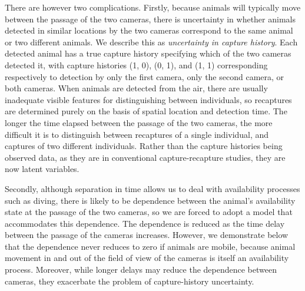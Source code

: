 \documentclass[useAMS, usenatbib, referee]{biom}\usepackage[]{graphicx}\usepackage[]{color}
\begin{document}
There are however two complications. Firstly, because animals will typically move between the passage of the two cameras, there is uncertainty in whether animals detected in similar locations by the two cameras correspond to the same animal or two different animals. We describe this as {\em uncertainty in capture history}. Each detected animal has a true capture history specifying which of the two cameras detected it, with capture histories (1, 0), (0, 1), and (1, 1) corresponding respectively to detection by only the first camera, only the second camera, or both cameras. When animals are detected from the air, there are usually inadequate visible features for distinguishing between individuals, so recaptures are determined purely on the basis of spatial location and detection time. The longer the time elapsed between the passage of the two cameras, the more difficult it is to distinguish between recaptures of a single individual, and captures of two different individuals. Rather than the capture histories being observed data, as they are in conventional capture-recapture studies, they are now latent variables.

Secondly, although separation in time allows us to deal with availability processes such as diving, there is likely to be dependence between the animal's availability state at the passage of the two cameras, so we are forced to adopt a model that accommodates this dependence. The dependence is reduced as the time delay between the passage of the cameras increases. However, we demonstrate below that the dependence never reduces to zero if animals are mobile, because animal movement in and out of the field of view of the cameras is itself an availability process. Moreover, while longer delays may reduce the dependence between cameras, they exacerbate the problem of capture-history uncertainty.

\end{document}
